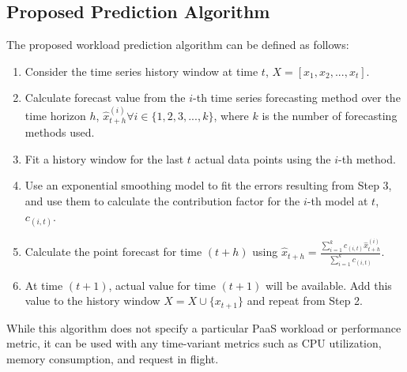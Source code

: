 \subsection{Proposed Prediction Algorithm}
The proposed workload prediction algorithm can be defined as follows:
\begin{enumerate}
\item Consider the time series history window at time $t$, $X=[x_{1}, x_{2}, ..., x_{t}]$.
\item Calculate forecast value from the $i$-th time series forecasting method over the time horizon $h$, $\hat{x}_{t+h}^{(i)} \forall i \in \{1, 2, 3, ..., k\}$, where $k$ is the number of forecasting methods used.
\item Fit a history window for the last $t$ actual data points using the $i$-th method.
\item Use an exponential smoothing model to fit the errors resulting from Step 3, and use them to calculate the contribution factor for the $i$-th model at $t$, $c_{(i,t)}$.
\item Calculate the point forecast for time $(t+h)$ using
$\hat{x}_{t+h}= \frac{\sum_{i=1}^{k}c_{(i,t)} \hat{x}_{t+h}^{(i)}}{\sum_{i=1}^{k}c_{(i,t)}}$.
\item At time $(t+1)$, actual value for time $(t+1)$ will be available. Add this value to the history window $X=X\cup \{x_{t+1}\}$ and repeat from Step 2.
\end{enumerate}
While this algorithm does not specify a particular PaaS workload or performance metric, it can be used with any time-variant metrics such as CPU utilization, memory consumption, and request in flight.